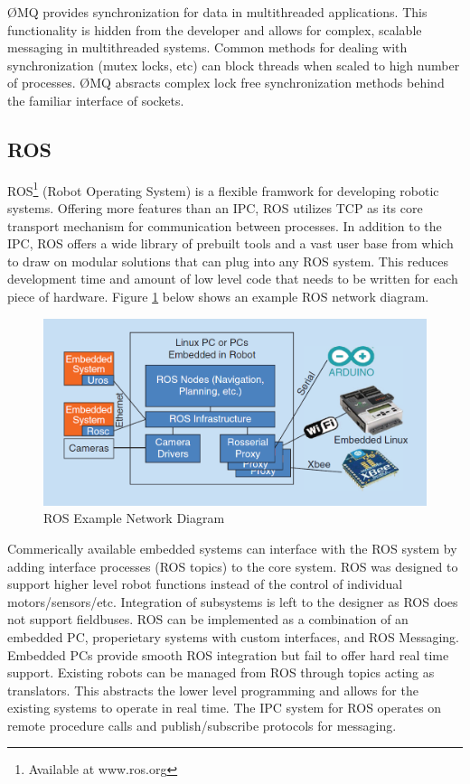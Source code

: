 ØMQ provides synchronization for data in multithreaded applications. This functionality is hidden from the developer and allows for complex, scalable messaging in multithreaded systems. Common methods for dealing with synchronization (mutex locks, etc) can block threads when scaled to high number of processes. ØMQ absracts complex lock free synchronization methods behind the familiar interface of sockets\cite{MULTITHREADZMQ}.

\subsection{ROS}

ROS\footnote{Available at www.ros.org} (Robot Operating System) is a flexible framwork for developing robotic systems. Offering more features than an IPC, ROS utilizes TCP as its core transport mechanism for communication between processes. In addition to the IPC, ROS offers a wide library of prebuilt tools and a vast user base from which to draw on modular solutions that can plug into any ROS system. This reduces development time and amount of low level code that needs to be written for each piece of hardware. Figure \ref{fig:ROS Network Diagram} below shows an example ROS network diagram.

\begin{figure}[thpb]
 \centering
 \includegraphics[width=1.0\columnwidth]{./images/rosnet.png}
  \caption{ROS Example Network Diagram}
  \label{fig:ROS Network Diagram}
\end{figure} 

Commerically available embedded systems can interface with the ROS system by adding interface processes (ROS topics) to the core system. ROS was designed to support higher level robot functions instead of the control of individual motors/sensors/etc. Integration of subsystems is left to the designer as ROS does not support fieldbuses\cite{EMBEDDEDROS}. ROS can be implemented as a combination of an embedded PC, properietary systems with custom interfaces, and ROS Messaging. Embedded PCs provide smooth ROS integration but fail to offer hard real time support. Existing robots can be managed from ROS through topics acting as translators. This abstracts the lower level programming and allows for the existing systems to operate in real time. The IPC system for ROS operates on remote procedure calls and publish/subscribe protocols for messaging. 

